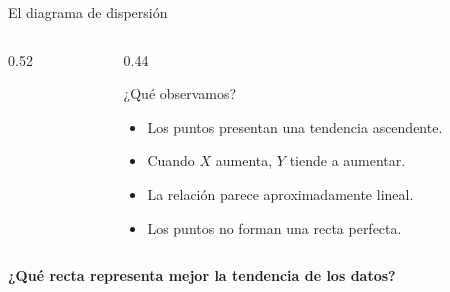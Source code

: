 \documentclass[aspectratio=169,11pt]{beamer}
\newcommand{\pregunta}[1]{%
  {\color{cAcc}\bfseries #1}%
}
\newenvironment{cerrado}[1]
  {\begin{block}{#1}
   \begin{minipage}{\linewidth}
   \raggedright}
  {\end{minipage}
   \end{block}}
\begin{document}
\begin{frame}{El diagrama de dispersión}
\begin{center}
\begin{minipage}{0.92\textwidth}
\begin{columns}[T,onlytextwidth]
\begin{column}{0.52\textwidth}
\begin{center}
\begin{tikzpicture}[x=0.62cm,y=0.42cm]
          \end{tikzpicture}

          \end{center}

        \end{column}

        \begin{column}{0.44\textwidth}

          \begin{cerrado}{¿Qué observamos?}

            \begin{itemize}
              \setlength{\itemsep}{0.2em}

              \item Los puntos presentan una tendencia ascendente.

              \item Cuando \(X\) aumenta, \(Y\) tiende a aumentar.

              \item La relación parece aproximadamente lineal.

              \item Los puntos no forman una recta perfecta.

            \end{itemize}

          \end{cerrado}

        \end{column}

      \end{columns}

      \vspace{0.15em}

      \begin{center}
        \pregunta{¿Qué recta representa mejor la tendencia de los datos?}
      \end{center}

    \end{minipage}
  \end{center}

\end{frame}
\end{document}
